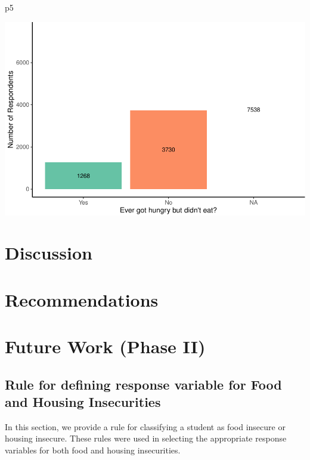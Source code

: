 \documentclass[
  10pt,
]{article}
\newenvironment{Shaded}{\begin{snugshade}}{\end{snugshade}}
\newcommand{\NormalTok}[1]{#1}
\begin{document}
\begin{Shaded}
\begin{Highlighting}[]
\NormalTok{p5}
\end{Highlighting}
\end{Shaded}

\includegraphics{phase1_report_files/figure-latex/unnamed-chunk-3-4}

\hypertarget{discussion}{%
\section{Discussion}\label{discussion}}

\hypertarget{recommendations}{%
\section{Recommendations}\label{recommendations}}

\hypertarget{future-work-phase-ii}{%
\section{Future Work (Phase II)}\label{future-work-phase-ii}}

\hypertarget{rule-for-defining-response-variable-for-food-and-housing-insecurities}{%
\subsection{Rule for defining response variable for Food and Housing Insecurities}\label{rule-for-defining-response-variable-for-food-and-housing-insecurities}}

In this section, we provide a rule for classifying a student as food insecure or housing insecure. These rules were used in selecting the appropriate response variables for both food and housing insecurities.
\end{document}

